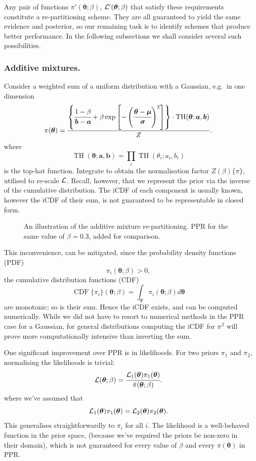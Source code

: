 \documentclass[usenatbib]{mnras}
\DeclareMathOperator{\TopHat}{TH}
\DeclareMathOperator{\CDF}{CDF}
\begin{document}
Any pair of functions \(\pi'(\bm{\theta}; \beta)\),
\({\cal L}'(\bm{\theta}; \beta)\) that satisfy these requirements
constitute a re-partitioning scheme. They are all guaranteed to yield
the same evidence and posterior, so our remaining task is to identify
schemes that produce better performance. In the following subsections
we shall consider several such possibilities.

\subsubsection{Additive mixtures.}\label{sec:org418133f}
Consider a weighted sum of a uniform distribution with
a Gaussian, e.g.~in one dimension
\begin{equation}\label{eq:additive-mix}
  \pi(\bm{\theta}) = \frac{ \left\lbrace \cfrac{1- \beta} {\bm{b} - \bm{a}} + \beta \exp \left[ -\left(\cfrac{\bm{\theta} - \bm{\mu}}{\bm{\sigma}} \right)^{2}\right]\right\rbrace \cdot \TopHat(\bm{\theta}; \bm{a}, \bm{b})}{Z}.
\end{equation}
where \[\TopHat(\bm{\theta};\bm{a},\bm{b}) = \prod_{i}
	\TopHat(\theta_{i}; a_{i}, b_{i})\] is the top-hat function. Integrate
to obtain the normalisation factor \(Z(\beta)\{\pi\}\), utilised
to re-scale \({\cal L}\). Recall, however, that we represent the
prior via the inverse of the cumulative distribution. The iCDF of
each component is usually known, however the iCDF of their sum, is
not guaranteed to be representable in closed form.

\begin{figure}
  
\caption{\label{orgda3e5e9}
An illustration of the additive mixture re-partitioning. PPR for the same value of \(\beta=0.3\), added for comparison.}
\end{figure}

This inconvenience, can be mitigated, since the probability
density functions (PDF) \[\pi_{i}(\bm{\theta}; \beta) >0,\] the
cumulative distribution functions (CDF)
\[\CDF\{\pi_{i}\}(\bm{\theta};\beta) = \int_{\Psi}
	\pi_{i}(\bm{\theta}; \beta)d\bm{\theta}\] are monotonic;
so is their sum. Hence the iCDF exists, and can be computed
numerically. While we did not have to resort to numerical methods
in the PPR case for a Gaussian, for general distributions
computing the iCDF for \(\pi^{\beta}\) will prove more
computationally intensive than inverting the sum.

One significant improvement over PPR is in likelihoods. For two
priors \(\pi_{1}\) and \(\pi_{2}\), normalising the likelihoods is
trivial:
\begin{equation*}
{\cal L}(\bm{\theta}; \beta) = \cfrac{{\cal L}_{1}(\bm{\theta}) \pi_{1}(\bm{\theta})}{\tilde{\pi}(\bm{\theta}; \beta)}.
\end{equation*}
where we've assumed that \[{\cal L}_{1}(\bm{\theta})\pi_{1}(\bm{\theta})
	={\cal L}_{2}(\bm{\theta}) \pi_{2}(\bm{\theta}).\] This generalises
straightforwardly to \(\pi_{i}\) for all \(i\). The likelihood is a
well-behaved function in the prior space, (because we've required
the priors be non-zero in their domain), which is not guaranteed
for every value of \(\beta\) and every \(\pi(\bm{\theta})\) in PPR.
\end{document}
